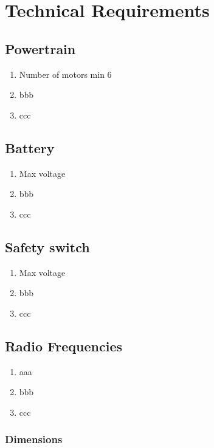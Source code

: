 
\chapter{Technical Requirements}\label{chapter:Technical}

\section{Powertrain}
\begin{enumerate}
    \item Number of motors min 6
    \item bbb
    \item ccc
  \end{enumerate}

  \section{Battery}
  \begin{enumerate}
      \item Max voltage
      \item bbb
      \item ccc
    \end{enumerate}

    \section{Safety switch}
  \begin{enumerate}
      \item Max voltage
      \item bbb
      \item ccc
    \end{enumerate}


\section{Radio Frequencies}
    \begin{enumerate}
        \item aaa
        \item bbb
        \item ccc
      \end{enumerate}
  

\subsection{Dimensions}

